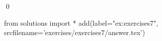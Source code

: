 
\begin{ex} 
  \label{ex:exercises7}
  
  \qed
\end{ex} 
\begin{python0}
from solutions import *
add(label="ex:exercises7",
    srcfilename='exercises/exercises7/answer.tex') 
\end{python0}
